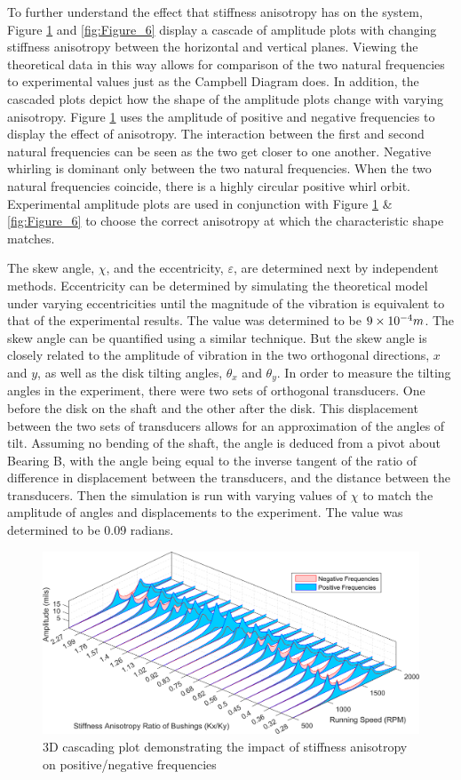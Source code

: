 		To further understand the effect that stiffness anisotropy has on the system, Figure \ref{fig:Figure_5} and \ref{fig:Figure_6}  display a cascade of amplitude plots with changing stiffness anisotropy between the horizontal and vertical planes. Viewing the theoretical data in this way allows for comparison of the two natural frequencies to experimental values just as the Campbell Diagram does. In addition, the cascaded plots depict how the shape of the amplitude plots change with varying anisotropy. Figure \ref{fig:Figure_5}  uses the amplitude of positive and negative frequencies to display the effect of anisotropy. The interaction between the first and second natural frequencies can be seen as the two get closer to one another. Negative whirling is dominant only between the two natural frequencies. When the two natural frequencies coincide, there is a highly circular positive whirl orbit. Experimental amplitude plots are used in conjunction with Figure \ref{fig:Figure_5}  \& \ref{fig:Figure_6}  to choose the correct anisotropy at which the characteristic shape matches.\par 
		The skew angle, $\chi$, and the eccentricity, $\varepsilon$, are determined next by independent methods. Eccentricity can be determined by simulating the theoretical model under varying eccentricities until the magnitude of the vibration is equivalent to that of the experimental results. The value was determined to be $9\times 10^{-4}  m$. The skew angle can be quantified using a similar technique. But the skew angle is closely related to the amplitude of vibration in the two orthogonal directions, $x$ and $y$, as well as the disk tilting angles, $\theta_x$ and $\theta_y$. In order to measure the tilting angles in the experiment, there were two sets of orthogonal transducers. One before the disk on the shaft and the other after the disk. This displacement between the two sets of transducers allows for an approximation of the angles of tilt. Assuming no bending of the shaft, the angle is deduced from a pivot about Bearing B, with the angle being equal to the inverse tangent of the ratio of difference in displacement between the transducers, and the distance between the transducers. Then the simulation is run with varying values of $\chi$ to match the amplitude of angles and displacements to the experiment. The value was determined to be 0.09 radians.\par 
		\begin{figure}[H]
			\centering
			\includegraphics[width=.75\linewidth]{./figures/Images/Figure_5.png}
			\caption{3D cascading plot demonstrating the impact of stiffness anisotropy on positive/negative frequencies}
			\label{fig:Figure_5}
		\end{figure}
